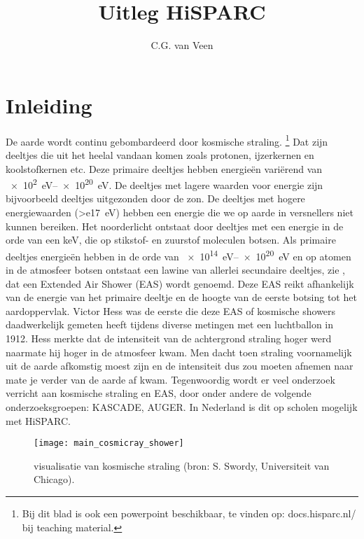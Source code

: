 

\title{Uitleg HiSPARC} 
\author{C.G. van Veen}



\maketitle

\section{Inleiding}

De aarde wordt continu gebombardeerd door kosmische straling.
\footnote{Bij dit blad is ook een powerpoint beschikbaar, te vinden op: 
docs.hisparc.nl/ bij teaching material.}  
Dat zijn deeltjes die uit het heelal vandaan komen zoals protonen, ijzerkernen en
koolstofkernen etc. Deze primaire deeltjes hebben energieën variërend
van \SIrange{e2}{e20}{\electronvolt}. De deeltjes met lagere
waarden voor energie zijn bijvoorbeeld deeltjes uitgezonden door de zon.
De deeltjes met hogere energiewaarden (\SI{>e17}{\electronvolt}) hebben
een energie die we op aarde in versnellers niet kunnen bereiken. Het
noorderlicht ontstaat door deeltjes met een energie in de orde van een
keV, die op stikstof- en zuurstof moleculen botsen. Als primaire
deeltjes energieën hebben in de orde van \SIrange{e14}{e20}
{\electronvolt} en op atomen in de atmosfeer botsen ontstaat een lawine
van allerlei secundaire deeltjes, zie , dat
een Extended Air Shower (EAS) wordt genoemd. Deze EAS reikt afhankelijk
van de energie van het primaire deeltje en de hoogte van de eerste
botsing tot het aardoppervlak. Victor Hess was de eerste die deze EAS of
kosmische showers daadwerkelijk gemeten heeft tijdens diverse metingen
met een luchtballon in 1912. Hess merkte dat de intensiteit van de
achtergrond straling hoger werd naarmate hij hoger in de atmosfeer kwam.
Men dacht toen straling voornamelijk uit de aarde afkomstig moest zijn
en de intensiteit dus zou moeten afnemen naar mate je verder van de
aarde af kwam. Tegenwoordig wordt er veel onderzoek verricht aan
kosmische straling en EAS, door onder andere de volgende
onderzoeksgroepen: KASCADE, AUGER. In Nederland is dit op scholen
mogelijk met HiSPARC.

\begin{figure} 
    \centering
    \texttt{[image: main\_cosmicray\_shower]} 
    \caption{visualisatie van kosmische straling
             (bron: S. Swordy, Universiteit van Chicago).} 
    \label{fig:main_cosmicray_shower} 
\end{figure}

